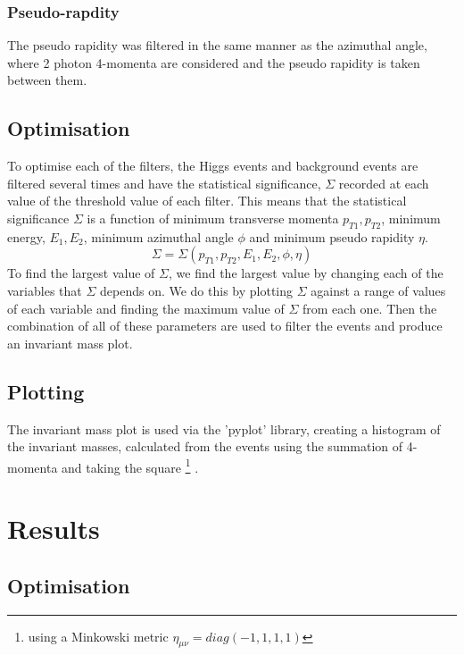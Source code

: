\documentclass{article}
\begin{document}
\subsubsection{Pseudo-rapdity}
The pseudo rapidity was filtered in the same manner as the azimuthal angle, where 2 photon 4-momenta are considered and the pseudo rapidity is taken between them.
\subsection{Optimisation}
To optimise each of the filters, the Higgs events and background events are filtered several times and have the statistical significance, $\Sigma$ recorded at each value of the threshold value of each filter. This means that the statistical significance $\Sigma$ is a function of minimum transverse momenta $p_{T1}, p_{T2}$, minimum energy, $E_1, E_2$, minimum azimuthal angle $\phi$ and minimum pseudo rapidity $\eta$.
\begin{equation}
\Sigma = \Sigma(p_{T1}, p_{T2}, E_1, E_2, \phi, \eta)
\end{equation}
To find the largest value of $\Sigma$, we find the largest value by changing each of the variables that $\Sigma$ depends on. We do this by plotting $\Sigma$ against a range of values of each variable and finding the maximum value of $\Sigma$ from each one. Then the combination of all of these parameters are used to filter the events and produce an invariant mass plot.
\subsection{Plotting}
The invariant mass plot is used via the 'pyplot' library, creating a histogram of the invariant masses, calculated from the events using the summation of 4-momenta and taking the square \footnote{using a Minkowski metric $\eta_{\mu \nu} = diag(-1, 1, 1, 1)$} . 
\section{Results}
\subsection{Optimisation}
\end{document}
